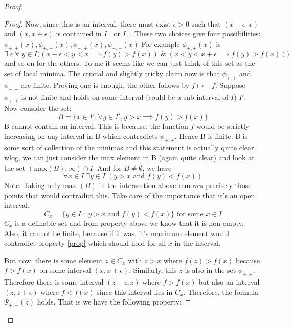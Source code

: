 \begin{proof}
\begin{proof}
        Now, since this is an interval, there must exist $\epsilon > 0$ such that $(x-\epsilon, x)$ and $(x, x+\epsilon)$ is contained in $I_+$ or $I_-$. 
        These two choices give four possibilities: $\phi_{+,+}(x), \phi_{+,-}(x), \phi_{-,+}(x), \phi_{-,-}(x)$
        For example $\phi_{+,+}(x)$ is
        \begin{equation*}
            \exists\; \epsilon\; \forall \;y \in I \Big( (x-\epsilon<y<x\implies f(y)>f(x)) \; \& \; (x<y<x+\epsilon\implies f(y)>f(x)) \Big)
        \end{equation*} and so on for the others. 
        To me it seems like we can just think of this set as the set of local minima.
        The crucial and slightly tricky claim now is that $\phi_{+,+}$ and $\phi_{-,-}$ are finite. Proving one is enough, the other follows by $f\mapsto -f$.
        Suppose $\phi_{+,+}$ is not finite and holds on some interval (could be a sub-interval of $I$) $I'$. Now consider the set:
        \begin{equation*}
            B = \{x\in I';\forall y\in I', y>x\implies f(y) > f(x)\}
        \end{equation*}
        B cannot contain an interval. This is because, the function $f$ would be strictly increasing on any interval in B which contradicts $\phi_{+,+}$. Hence B is finite. B is some sort of collection of the minimas and this statement is actually quite clear.
        \\ wlog, we can just consider the max element in B (again quite clear) and look at the set \newline $(\text{max}(B), \infty)\cap I$. And for $B\neq\emptyset$, we have
        \begin{equation}
        \label{prop}
            \forall x \in I\;\exists y\in I \;(y>x \text{ and } f(y) < f(x))
        \end{equation}
        Note: Taking only $\text{max }(B)$ in the intersection above removes precisely those points that would contradict this. Take care of the importance that it's an open interval.
        \begin{equation*}
            C_x = \{y\in I \; ; \; y>x \text{ and } f(y) < f(x)\} \text{ for some } x \in I
        \end{equation*}
        $C_x$ is a definable set and from property above we know that it is non-empty. Also, it cannot be finite, because if it was, it's maximum element would contradict property \ref{prop} which should hold for all $x$ in the interval.
        \par But now, there is some element $z\in C_x$ with $z > x$ where $f(z) > f(x)$ because $f > f(x)$ on some interval $(x, x + \epsilon)$. Similarly, this $z$ is also in the set $\phi_{+, +}$. Therefore there is some interval $(z - \epsilon, z)$ where $f > f(x)$ but also an interval $(z, z + \epsilon)$ where $f < f(x)$ since this interval lies in $C_x$. Therefore, the formula $\Psi_{+,-}(z)$ holds. That is we have the following property:

\end{proof}
\end{proof}

